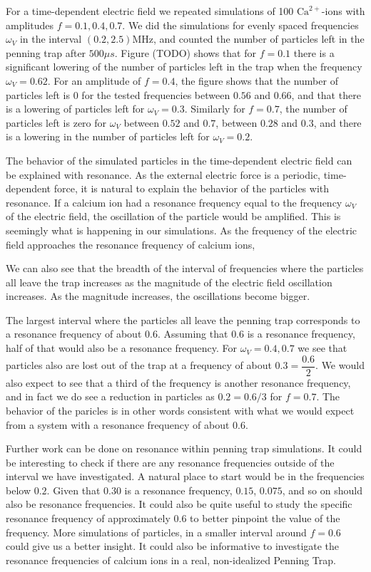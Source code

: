

For a time-dependent electric field we repeated simulations of 100 $\text{Ca}^{2+}$-ions with amplitudes $f = 0.1, 0.4, 0.7$. We did the simulations for evenly spaced frequencies $\omega_V$ in the interval $(0.2, 2.5)\text{MHz}$, and counted the number of particles left in the penning trap after $500\mu s$. Figure (TODO) shows that for $f=0.1$ there is a significant lowering of the number of particles left in the trap when the frequency $\omega_V = 0.62$. For an amplitude of $f=0.4$, the figure shows that the number of particles left is 0 for the tested frequencies between $0.56$ and $0.66$, and that there is a lowering of particles left for $\omega_V=0.3$. Similarly for $f=0.7$, the number of particles left is zero for $\omega_V$ between $0.52$ and $0.7$, between $0.28$ and $0.3$, and there is a lowering in the number of particles left for $\omega_V = 0.2$. 

 The behavior of the simulated particles in the time-dependent electric field can be explained with resonance. As the external electric force is a periodic, time-dependent force, it is natural to explain the behavior of the particles with resonance. If a calcium ion had a resonance frequency equal to the frequency $\omega_V$ of the electric field, the oscillation of the particle would be amplified. This is seemingly what is happening in our simulations. As the frequency of the electric field approaches the resonance frequency of calcium ions, 

We can also see that the breadth of the interval of frequencies where the particles all leave the trap increases as the magnitude of the electric field oscillation increases. As the magnitude increases, the oscillations become bigger.

The largest interval where the particles all leave the penning trap corresponds to a resonance frequency of about $0.6$. Assuming that $0.6$ is a resonance frequency, half of that would also be a resonance frequency. For $\omega_V=0.4, 0.7$ we see that particles also are lost out of the trap at a frequency of about $0.3=\dfrac{0.6}{2}$. We would also expect to see that a third of the frequency is another resonance frequency, and in fact we do see a reduction in particles as $0.2=0.6/3$ for $f=0.7$. The behavior of the paricles is in other words consistent with what we would expect from a system with a resonance frequency of about $0.6$.

Further work can be done on resonance within penning trap simulations. It could be interesting to check if there are any resonance frequencies outside of the interval we have investigated. A natural place to start would be in the frequencies below $0.2$. Given that $0.30$ is a resonance frequency, $0.15$, $0.075$, and so on should also be resonance frequencies. It could also be quite useful to study the specific resonance frequency of approximately $0.6$ to better pinpoint the value of the frequency. More simulations of particles, in a smaller interval around $f=0.6$ could give us a better insight. It could also be informative to investigate the resonance frequencies of calcium ions in a real, non-idealized Penning Trap. 
